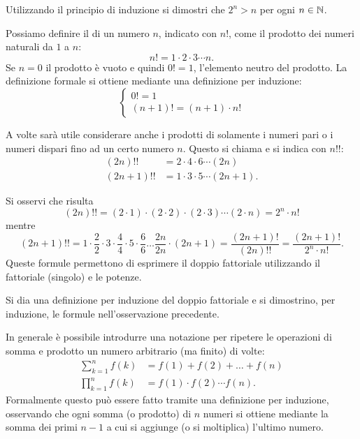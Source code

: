 \begin{exercise}
Utilizzando il principio di induzione
si dimostri che $2^n > n$ per ogni $n\in \mathbb N$.
\end{exercise}

\begin{definition}[fattoriale]
Possiamo definire il  di un numero $n$, indicato con $n!$, come il prodotto
dei numeri naturali da $1$ a $n$:
\[
  n!  = 1 \cdot 2 \cdot 3 \cdots n.
\]
Se $n=0$ il prodotto è vuoto e quindi $0!=1$, l'elemento neutro del prodotto.
La definizione formale si ottiene mediante una definizione per induzione:
\[
  \begin{cases}
    0! = 1 \\
    (n+1)! = (n+1) \cdot n!
  \end{cases}
\]

A volte sarà utile considerare anche i prodotti di solamente i numeri
pari o i numeri dispari fino ad un certo numero $n$. Questo
si chiama  e si indica con $n!!$:
\begin{align*}
  (2n)!! &= 2 \cdot 4 \cdot 6 \cdots (2n) \\
  (2n+1)!! &= 1 \cdot 3 \cdot 5 \cdots (2n+1).
\end{align*}
\end{definition}

\begin{remark}
Si osservi che risulta
\[
  (2n)!! = (2\cdot 1) \cdot (2\cdot 2) \cdot (2\cdot 3) \cdots (2\cdot n)
        = 2^n \cdot n!
\]
mentre
\[
  (2n+1)!! = 1 \cdot \frac{2}{2} \cdot 3 \cdot \frac{4}{4}
\cdot 5 \cdot \frac{6}{6} \dots \frac{2n}{2n} \cdot (2n+1)
= \frac{(2n+1)!}{(2n)!!}
 = \frac{(2n+1)!}{2^n \cdot n!}.
\]
Queste formule permettono di esprimere il doppio fattoriale utilizzando
il fattoriale (singolo) e le potenze.
\end{remark}

\begin{exercise}
Si dia una definizione per induzione del doppio fattoriale
e si dimostrino, per induzione, le formule nell'osservazione precedente.
\end{exercise}

In generale è possibile introdurre una notazione per ripetere le operazioni
di somma e prodotto un numero arbitrario (ma finito) di volte:
\begin{align*}
  \sum_{k=1}^n f(k) &= f(1) + f(2) + \dots + f(n) \\
  \prod_{k=1}^n f(k) &= f(1) \cdot f(2) \cdots f(n).
\end{align*}
Formalmente questo può essere fatto tramite una definizione per induzione,
osservando che ogni somma (o prodotto) di $n$ numeri si ottiene mediante
la somma dei primi $n-1$ a cui si aggiunge (o si moltiplica) l'ultimo numero.

